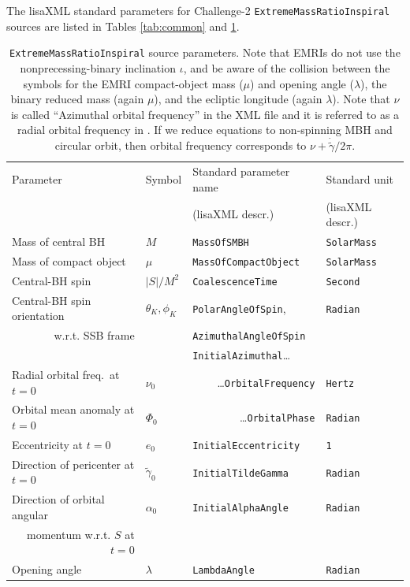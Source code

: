\documentclass[12pt]{iopart}
\begin{document}
The lisaXML standard parameters for Challenge-2 \texttt{ExtremeMassRatioInspiral} sources are listed in Tables \ref{tab:common} and \ref{tab:emri}.
%
\begin{table}
\begin{tabular}{llll}
\hline
{Parameter} &
{Symbol} &
{Standard parameter name} &
{Standard unit} \\
& & (lisaXML descr.) & (lisaXML descr.) \\
\hline
Mass of central BH     & $M$      & \texttt{MassOfSMBH}           & \texttt{SolarMass} \\
Mass of compact object & $\mu$  & \texttt{MassOfCompactObject}  & \texttt{SolarMass} \\
Central-BH spin        & $|S|/M^2$  & \texttt{CoalescenceTime}      & \texttt{Second} \\
Central-BH spin orientation & $\theta_K, \phi_K$ & \texttt{PolarAngleOfSpin}, & \texttt{Radian} \\
 \multicolumn{1}{r}{w.r.t. SSB frame}  &                         & \texttt{AzimuthalAngleOfSpin} & \\ \hline
& & \texttt{InitialAzimuthal}\ldots & \\                   
Radial orbital freq.\ at $t = 0$ & $\nu_0$ & \multicolumn{1}{r}{\ldots\texttt{OrbitalFrequency}} & \texttt{Hertz} \\
Orbital mean anomaly at $t = 0$ & $\Phi_0$ & \multicolumn{1}{r}{\ldots\texttt{OrbitalPhase}} & \texttt{Radian} \\ \hline
Eccentricity at $t = 0$ & $e_0$ & \texttt{InitialEccentricity} & \texttt{1} \\
Direction of pericenter at $t = 0$ & $\tilde{\gamma}_0$ & \texttt{InitialTildeGamma} & \texttt{Radian} \\
Direction of orbital angular & $\alpha_0$ & \texttt{InitialAlphaAngle} & \texttt{Radian} \\
\multicolumn{1}{r}{momentum w.r.t. $S$ at $t = 0$} & & & \\
Opening angle & $\lambda$ & \texttt{LambdaAngle} & \texttt{Radian} \\ 
\hline
\end{tabular}
\caption{\texttt{ExtremeMassRatioInspiral} source parameters. Note that EMRIs do not use the nonprecessing-binary inclination $\iota$, and be aware of the collision between the symbols for the EMRI compact-object mass ($\mu$) and opening angle ($\lambda$), the binary reduced mass (again $\mu$), and the ecliptic longitude (again $\lambda$). Note that $\nu$ is called ``Azimuthal orbital frequency'' in the XML file and it is referred to as a radial orbital frequency in \cite{BC}.
If we reduce equations to non-spinning MBH and circular orbit, then 
orbital frequency corresponds to $\nu + \dot{\tilde{\gamma}}/{2\pi}$.
\label{tab:emri}}
\end{table}
\end{document}
